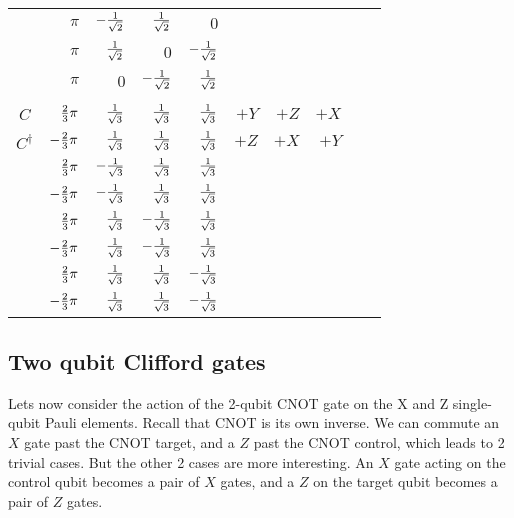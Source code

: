 \begin{table}[htp]
\begin{center}
\begin{tabular}{crrrrrrrcc}
\\
						& $\pi$ 				& $-\sfrac{1}{\sqrt{2}}$ & $\sfrac{1}{\sqrt{2}}$ & 0 	&%
\\
						& $\pi$ 				& $\sfrac{1}{\sqrt{2}}$ &0 & $-\sfrac{1}{\sqrt{2}}$ 	&%
\\
						& $\pi$ 				& 0 & $-\sfrac{1}{\sqrt{2}}$ & $\sfrac{1}{\sqrt{2}}$ 	&%
\\
\\
$C$						& $\sfrac{2}{3}\pi$ 	& $\sfrac{1}{\sqrt{3}}$ & $\sfrac{1}{\sqrt{3}}$ & $\sfrac{1}{\sqrt{3}}$ & $+Y$ & $+Z$ & $+X$ \\
$C^\dagger$						& $-\sfrac{2}{3}\pi$	& $\sfrac{1}{\sqrt{3}}$ & $\sfrac{1}{\sqrt{3}}$ & $\sfrac{1}{\sqrt{3}}$ & $+Z$ & $+X$ & $+Y$ \\
						& $\sfrac{2}{3}\pi$		& $-\sfrac{1}{\sqrt{3}}$ & $\sfrac{1}{\sqrt{3}}$ & $\sfrac{1}{\sqrt{3}}$ & \\
						& $-\sfrac{2}{3}\pi$	& $-\sfrac{1}{\sqrt{3}}$ & $\sfrac{1}{\sqrt{3}}$ & $\sfrac{1}{\sqrt{3}}$ & \\

						& $\sfrac{2}{3}\pi$		& $\sfrac{1}{\sqrt{3}}$ & $-\sfrac{1}{\sqrt{3}}$ & $\sfrac{1}{\sqrt{3}}$ & \\
						& $-\sfrac{2}{3}\pi$	& $\sfrac{1}{\sqrt{3}}$ & $-\sfrac{1}{\sqrt{3}}$ & $\sfrac{1}{\sqrt{3}}$ & \\

						& $\sfrac{2}{3}\pi$		& $\sfrac{1}{\sqrt{3}}$ & $\sfrac{1}{\sqrt{3}}$ & $-\sfrac{1}{\sqrt{3}}$ & \\
						& $-\sfrac{2}{3}\pi$	& $\sfrac{1}{\sqrt{3}}$ & $\sfrac{1}{\sqrt{3}}$ & $-\sfrac{1}{\sqrt{3}}$ &
\end{tabular}
\end{center}
\end{table}%

\subsection{Two qubit Clifford gates}

Lets now consider the action of the 2-qubit CNOT gate on the X and Z single-qubit Pauli elements. Recall that CNOT is its own inverse. We can commute an $X$ gate past the CNOT target, and a $Z$ past the CNOT control, which leads to 2 trivial cases. But the other 2 cases are more interesting. An $X$ gate acting on the control qubit becomes a pair of $X$ gates, and a $Z$ on the target qubit becomes a pair of $Z$ gates.


